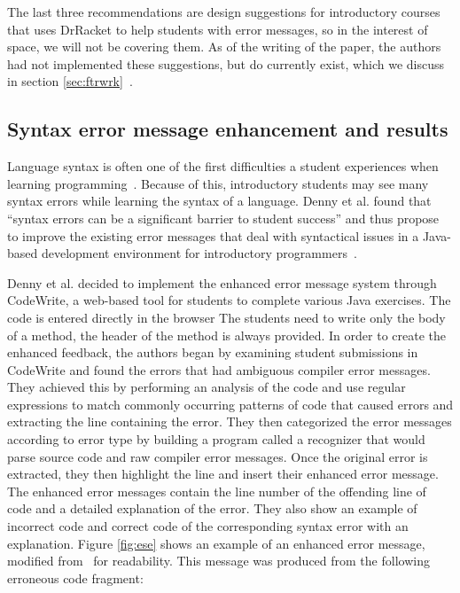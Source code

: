 \documentclass{sig-alternate}
\begin{document}
The last three recommendations are design suggestions for introductory courses that uses DrRacket to help students with error messages, so in the interest of space, we will not be covering them.
As of the writing of the paper, the authors had not implemented these suggestions, but do currently exist, which we discuss in section \ref{sec:ftrwrk}~\cite{Marceau:2011:MYL:2048237.2048241}. 



\subsection{Syntax error message enhancement and results}\label{subsec:syntax enhancement}

Language syntax is often one of the first difficulties a student experiences when learning programming~\cite{Denny:2011:USB:1999747.1999807}.
Because of this, introductory students may see many syntax errors while learning the syntax of a language.
Denny et al. found that ``syntax errors can be a significant barrier to student success'' and thus propose to improve the existing error messages that deal with syntactical issues in a Java-based development environment for introductory programmers~\cite{Denny:2014:ESE:2591708.2591748}.

Denny et al. decided to implement the enhanced error message system through CodeWrite, a web-based tool for students to complete various Java exercises.
The code is entered directly in the browser
The students need to write only the body of a method, the header of the method is always provided.
In order to create the enhanced feedback, the authors began by examining student submissions in CodeWrite and found the errors that had ambiguous compiler error messages. 
They achieved this by performing an analysis of the code and use regular expressions to match commonly occurring patterns of code that caused errors and  extracting the line containing the error.
They then categorized the error messages according to error type by building a program called a recognizer that would parse source code and raw compiler error messages.
Once the original error is extracted, they then highlight the line and insert their enhanced error message.
The enhanced error messages contain the line number of the offending line of code and a detailed explanation of the error.
They also show an example of incorrect code and correct code of the corresponding syntax error with an explanation.
Figure \ref{fig:ese} shows an example of an enhanced error message, modified from~\cite{Denny:2014:ESE:2591708.2591748} for readability.
This message was produced from the following erroneous code fragment:
\end{document}
